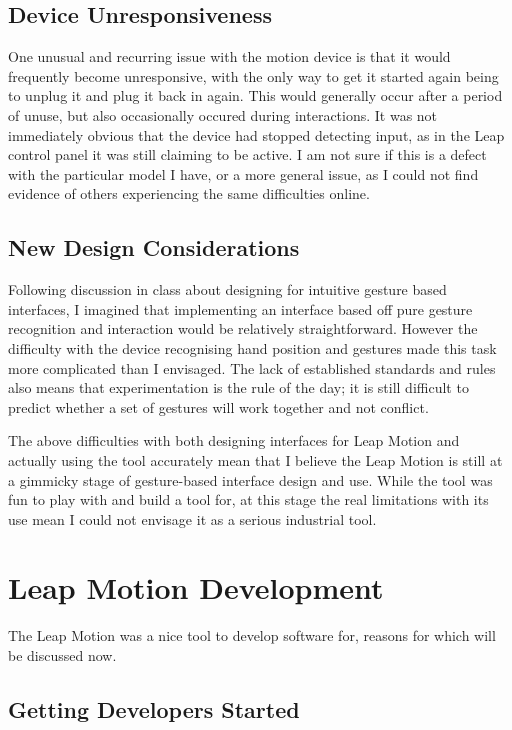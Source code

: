\documentclass{sigplanconf}
\begin{document}
\subsection{Device Unresponsiveness}

One unusual and recurring issue with the motion device is that it would frequently become unresponsive, with the only way to get it started again being to unplug it and plug it back in again. This would generally occur after a period of unuse, but also occasionally occured during interactions. It was not immediately obvious that the device had stopped detecting input, as in the Leap control panel it was still claiming to be active. I am not sure if this is a defect with the particular model I have, or a more general issue, as I could not find evidence of others experiencing the same difficulties online.

\subsection{New Design Considerations}

Following discussion in class about designing for intuitive gesture based interfaces, I imagined that implementing an interface based off pure gesture recognition and interaction would be relatively straightforward. However the difficulty with the device recognising hand position and gestures made this task more complicated than I envisaged. The lack of established standards and rules also means that experimentation is the rule of the day; it is still difficult to predict whether a set of gestures will work together and not conflict. 

The above difficulties with both designing interfaces for Leap Motion and actually using the tool accurately mean that I believe the Leap Motion is still at a gimmicky stage of gesture-based interface design and use. While the tool was fun to play with and build a tool for, at this stage the real limitations with its use mean I could not envisage it as a serious industrial tool. 

\section{Leap Motion Development}
\label{sec:leap_development}

The Leap Motion was a nice tool to develop software for, reasons for which will be discussed now.

\subsection{Getting Developers Started}
\end{document}
